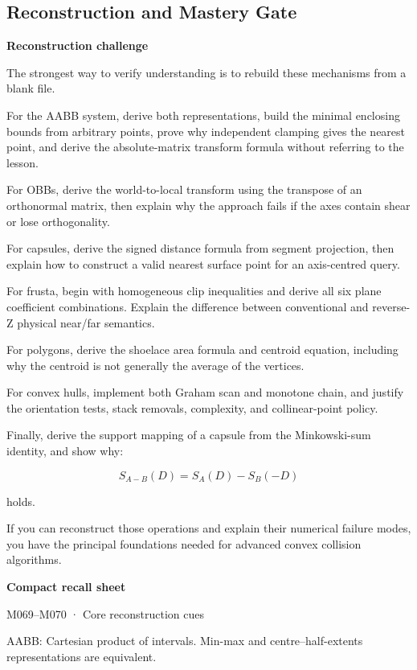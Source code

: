 \subsection{Reconstruction and Mastery Gate}\label{04-visual-computing-ii-ch022-reconstruction-and-mastery-gate}

\textbf{Reconstruction challenge}

The strongest way to verify understanding is to rebuild these mechanisms from a blank file.

For the AABB system, derive both representations, build the minimal enclosing bounds from arbitrary points, prove why independent clamping gives the nearest point, and derive the absolute-matrix transform formula without referring to the lesson.

For OBBs, derive the world-to-local transform using the transpose of an orthonormal matrix, then explain why the approach fails if the axes contain shear or lose orthogonality.

For capsules, derive the signed distance formula from segment projection, then explain how to construct a valid nearest surface point for an axis-centred query.

For frusta, begin with homogeneous clip inequalities and derive all six plane coefficient combinations. Explain the difference between conventional and reverse-Z physical near/far semantics.

For polygons, derive the shoelace area formula and centroid equation, including why the centroid is not generally the average of the vertices.

For convex hulls, implement both Graham scan and monotone chain, and justify the orientation tests, stack removals, complexity, and collinear-point policy.

Finally, derive the support mapping of a capsule from the Minkowski-sum identity, and show why:

\[
S_{A-B}(D)=S_A(D)-S_B(-D)
\]

holds.

If you can reconstruct those operations and explain their numerical failure modes, you have the principal foundations needed for advanced convex collision algorithms.

\textbf{Compact recall sheet}

M069--M070 · Core reconstruction cues

AABB: Cartesian product of intervals. Min-max and centre--half-extents representations are equivalent.

